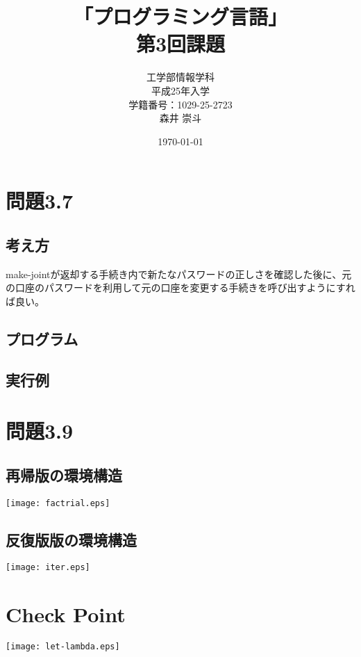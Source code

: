 \documentclass[a4paper,12pt]{article}
\begin{document}
\title{「プログラミング言語」\\
第3回課題}
\author{工学部情報学科\\
平成25年入学\\
学籍番号：1029-25-2723\\
森井 崇斗 }
\date{\today}
\maketitle

\lstset{numbers=left,basicstyle=\ttfamily\small,
  commentstyle=\textit, keywordstyle=\bfseries}

  \section{問題3.7}
  \subsection{考え方}
  make-jointが返却する手続き内で新たなパスワードの正しさを確認した後に、元の口座のパスワードを利用して元の口座を変更する手続きを呼び出すようにすれば良い。
  \subsection{プログラム}
  
  \subsection{実行例}
  

  \section{問題3.9}
  \subsection{再帰版の環境構造}
  \texttt{[image: factrial.eps]}

  \subsection{反復版版の環境構造}
  \texttt{[image: iter.eps]}

  \section{Check Point}

  \texttt{[image: let-lambda.eps]}
\end{document}
